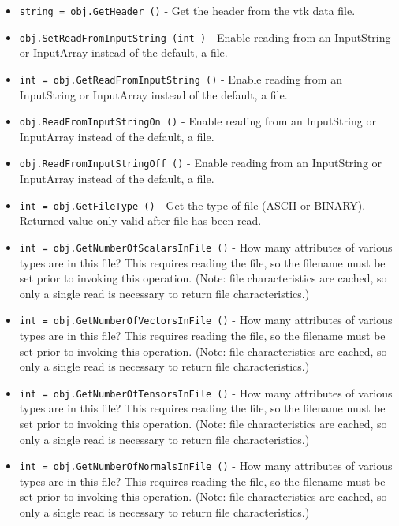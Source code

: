 \begin{itemize}
\item  \verb|string = obj.GetHeader ()| -  Get the header from the vtk data file.

\item  \verb|obj.SetReadFromInputString (int )| -  Enable reading from an InputString or InputArray instead of the default, 
 a file.

\item  \verb|int = obj.GetReadFromInputString ()| -  Enable reading from an InputString or InputArray instead of the default, 
 a file.

\item  \verb|obj.ReadFromInputStringOn ()| -  Enable reading from an InputString or InputArray instead of the default, 
 a file.

\item  \verb|obj.ReadFromInputStringOff ()| -  Enable reading from an InputString or InputArray instead of the default, 
 a file.

\item  \verb|int = obj.GetFileType ()| -  Get the type of file (ASCII or BINARY). Returned value only valid
 after file has been read.

\item  \verb|int = obj.GetNumberOfScalarsInFile ()| -  How many attributes of various types are in this file? This 
 requires reading the file, so the filename must be set prior 
 to invoking this operation. (Note: file characteristics are
 cached, so only a single read is necessary to return file
 characteristics.)

\item  \verb|int = obj.GetNumberOfVectorsInFile ()| -  How many attributes of various types are in this file? This 
 requires reading the file, so the filename must be set prior 
 to invoking this operation. (Note: file characteristics are
 cached, so only a single read is necessary to return file
 characteristics.)

\item  \verb|int = obj.GetNumberOfTensorsInFile ()| -  How many attributes of various types are in this file? This 
 requires reading the file, so the filename must be set prior 
 to invoking this operation. (Note: file characteristics are
 cached, so only a single read is necessary to return file
 characteristics.)

\item  \verb|int = obj.GetNumberOfNormalsInFile ()| -  How many attributes of various types are in this file? This 
 requires reading the file, so the filename must be set prior 
 to invoking this operation. (Note: file characteristics are
 cached, so only a single read is necessary to return file
 characteristics.)


\end{itemize}
